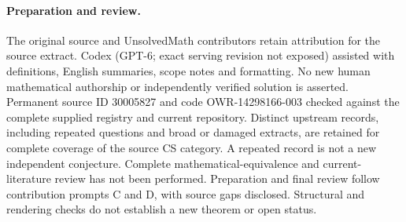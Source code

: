 \documentclass[11pt]{article}
\begin{document}
\paragraph{Preparation and review.}
The original source and UnsolvedMath contributors retain attribution for the source extract. Codex (GPT-6; exact serving revision not exposed) assisted with definitions, English summaries, scope notes and formatting. No new human mathematical authorship or independently verified solution is asserted. Permanent source ID 30005827 and code OWR-14298166-003 checked against the complete supplied registry and current repository. Distinct upstream records, including repeated questions and broad or damaged extracts, are retained for complete coverage of the source CS category. A repeated record is not a new independent conjecture. Complete mathematical-equivalence and current-literature review has not been performed. Preparation and final review follow contribution prompts C and D, with source gaps disclosed. Structural and rendering checks do not establish a new theorem or open status.
\label{end:30005827}
\end{document}
